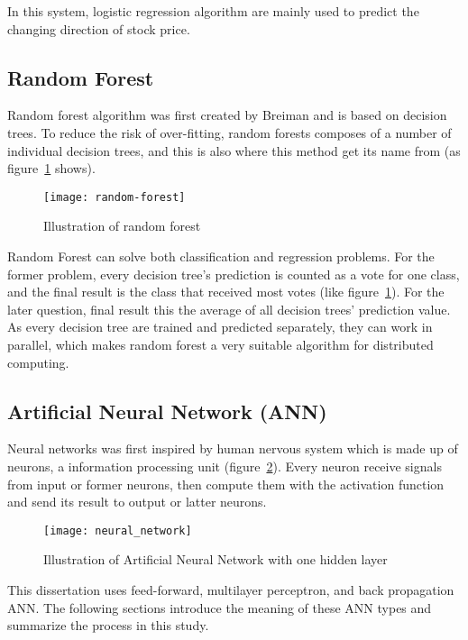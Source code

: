 In this system, logistic regression algorithm are mainly used to predict the changing direction of stock price.

\subsection{Random Forest}
Random forest algorithm was first created by Breiman and is based on decision trees\cite{lauretto2013evaluation}. To reduce the risk of over-fitting, random forests composes of a number of individual decision trees, and this is also where this method get its name from (as figure~\ref{fg:decision-tree} shows).
\begin{figure}[h]
	\centering
	\texttt{[image: random-forest]}
	\caption{Illustration of random forest}
	\label{fg:decision-tree}
\end{figure}

Random Forest can solve both classification and regression problems. For the former problem, every decision tree's prediction is counted as a vote for one class, and the final result is the class that received most votes (like figure~\ref{fg:decision-tree}). For the later question, final result this the average of all decision trees' prediction value.\\


As every decision tree are trained and predicted separately, they can work in parallel, which makes random forest a very suitable algorithm for distributed computing.


\subsection{Artificial Neural Network (ANN)}
Neural networks was first inspired by human nervous system which is made up of neurons, a information processing unit (figure~\ref{fg:neural-nework}). Every neuron receive signals from input or former neurons, then compute them with the activation function and send its result to output or latter neurons\cite[p.~200]{4_kantardzic}.
\begin{figure}[ht]
	\centering
	\texttt{[image: neural\_network]}
	\caption{Illustration of Artificial Neural Network with one hidden layer}
	\label{fg:neural-nework}
\end{figure}

This dissertation uses feed-forward, multilayer perceptron, and back propagation ANN. The following sections introduce the meaning of these ANN types and summarize the process in this study.


